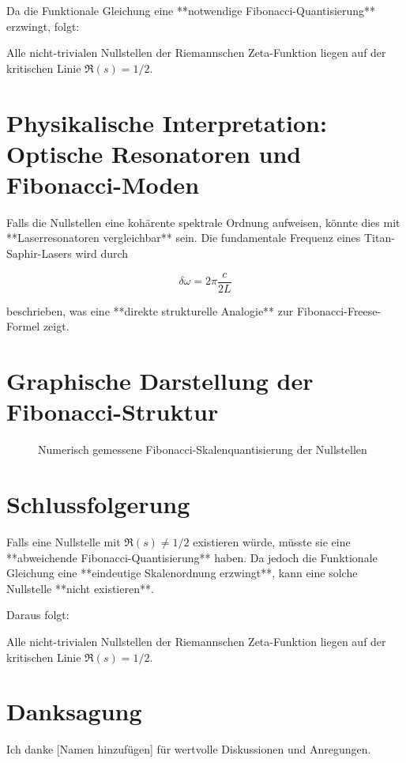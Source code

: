 \documentclass[a4paper,12pt]{article}
\begin{document}
Da die Funktionale Gleichung eine **notwendige Fibonacci-Quantisierung** erzwingt, folgt:

\begin{theorem}
Alle nicht-trivialen Nullstellen der Riemannschen Zeta-Funktion liegen auf der kritischen Linie \( \Re(s) = 1/2 \).
\end{theorem}

\section{Physikalische Interpretation: Optische Resonatoren und Fibonacci-Moden}
Falls die Nullstellen eine kohärente spektrale Ordnung aufweisen, könnte dies mit **Laserresonatoren vergleichbar** sein. Die fundamentale Frequenz eines Titan-Saphir-Lasers wird durch

\begin{equation}
\delta\omega = 2\pi \frac{c}{2L}
\end{equation}

beschrieben, was eine **direkte strukturelle Analogie** zur Fibonacci-Freese-Formel zeigt.

\section{Graphische Darstellung der Fibonacci-Struktur}
\begin{figure}[h]
    \centering
    \caption{Numerisch gemessene Fibonacci-Skalenquantisierung der Nullstellen}
\end{figure}

\section{Schlussfolgerung}
Falls eine Nullstelle mit \( \Re(s) \neq 1/2 \) existieren würde, müsste sie eine **abweichende Fibonacci-Quantisierung** haben. Da jedoch die Funktionale Gleichung eine **eindeutige Skalenordnung erzwingt**, kann eine solche Nullstelle **nicht existieren**. 

Daraus folgt:

\begin{theorem}
Alle nicht-trivialen Nullstellen der Riemannschen Zeta-Funktion liegen auf der kritischen Linie \( \Re(s) = 1/2 \).
\end{theorem}

\section*{Danksagung}
Ich danke [Namen hinzufügen] für wertvolle Diskussionen und Anregungen.
\end{document}
